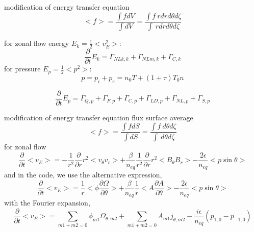 \documentclass{beamer}
\begin{document}
%
%
\begin{frame}{modification of energy transfer equation}
\begin{equation}
<f>=\frac{\int{f}dV}{\int{dV}}
=\frac{\int{f}\ rdrd\theta{d\zeta}}{\int\ rdrd\theta{d\zeta}}
\end{equation}

for zonal flow energy $E_k=\frac{1}{2}<v_E^2>$:
\begin{equation}
\frac{\partial}{\partial{t}}E_k=\Gamma_{NLk,k}+\Gamma_{NLm,k}+\Gamma_{C,k}
\end{equation}
for pressure $E_p=\frac{1}{2}<p^2>$:
\begin{equation}
p=p_i+p_e=n_0T+(1+\tau)T_0{n}
\end{equation}

\begin{equation}
\frac{\partial}{\partial{t}}E_p=\Gamma_{Q,p}+\Gamma_{F,p}+\Gamma_{C,p}+\Gamma_{LD,p}+\Gamma_{NL,p}+\Gamma_{S,p}
\end{equation}
\end{frame}

\begin{frame}{modification of energy transfer equation}
flux surface average
\begin{equation}
<f>=\frac{\int{f}dS}{\int{dS}}
=\frac{\int{f}\ d\theta{d\zeta}}{\int\ d\theta{d\zeta}}
\end{equation}
for zonal flow 
\begin{equation}
\frac{\partial}{\partial{t}}<v_E>
=-\frac{1}{r^2}\frac{\partial}{\partial{r}}r^2<v_\theta{v_r}>
+\frac{\beta}{n_{eq}}\frac{1}{r^2}\frac{\partial}{\partial{r}}r^2<B_\theta{B_r}>
-\frac{2\epsilon}{n_{eq}}<p\sin\theta>
\end{equation}
and in the code, we use the alternative expression,
\begin{equation}
\frac{\partial}{\partial{t}}<v_E>
=\frac{1}{r}<\phi\frac{\partial{\Omega}}{\partial\theta}>
+\frac{\beta}{n_{eq}}\frac{1}{r}<A\frac{\partial{A}}{\partial\theta}>
-\frac{2\epsilon}{n_{eq}}<p\sin\theta>
\end{equation} 
with the Fourier expansion,
\begin{equation}
\frac{\partial}{\partial{t}}<v_E>
=\sum_{m1+m2=0}{\phi_{m1}}{\Omega_{\theta,m2}}
+\sum_{m1+m2=0}{A_{m1}}{j_{\theta,m2}}
-\frac{i\epsilon}{n_{eq}}(p_{1,0}-p_{-1,0})
\end{equation} 
\end{frame}
\end{document}
